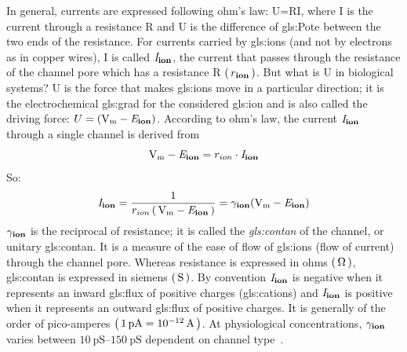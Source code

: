 \documentclass[class={myRUCProject}, crop=false]{standalone}
\begin{document}
In general, currents are expressed following ohm's law: U=RI, where I is the current through a resistance R and U is the difference of \gls{gls:Pote} between the two ends of the resistance. For currents carried by \glspl{gls:ion} (and not by electrons as in copper wires), I is called  \(\mathit{I}_\mathbf{ion}\), the current that passes through the resistance of the channel pore which has a resistance R \(\br{\res\ion}\). But what is U in biological systems? U is the force that makes \glspl{gls:ion} move in a particular direction; it is the electrochemical \gls{gls:grad} for the considered \gls{gls:ion} and is also called the driving force: \(U=(\unit{\V\membrane} - \equilibria\ion)\). According to ohm's law, the current \(\mathit{I}_\mathbf{ion}\) through a single channel is derived from 
\begin{equation}
    \unit{\V\membrane} - \equilibria\ion = r_{ion} \cdot \cur\ion
\end{equation}
So:
\begin{equation}
    \cur\ion= \frac{1}{r_{ion}\br{\unit{\V\membrane} - \equilibria\ion}} = \uncon\ion(\unit{\V\membrane} - \equilibria\ion)
\end{equation}
\(\gamma_\mathbf{ion}\) is the reciprocal of resistance; it is called the \textit{\gls{gls:contan}} of the channel, or unitary \gls{gls:contan}. It is a measure of the ease of flow of \glspl{gls:ion} (flow of current) through the channel pore. Whereas resistance is expressed in ohms \(\br{\unit{\ohm}}\), \gls{gls:contan} is expressed in siemens \(\br{\unit{\siemens}}\). By convention \(\mathit{I}_\mathbf{ion}\) is negative when it represents an inward \gls{gls:flux} of positive charges (\glspl{gls:cation}) and \(\mathit{I}_\mathbf{ion}\) is positive when it represents an outward \gls{gls:flux} of positive charges. It is generally of the order of pico-amperes \(\br{\qty{1}{\pico\ampere}=\qty{e-12}{\ampere}}\). At physiological concentrations, \(\gamma_\mathbf{ion}\) varies between \(\qtyrange{10}{150}{\pico\siemens}\) dependent on channel type~\cite{}.
\end{document}
